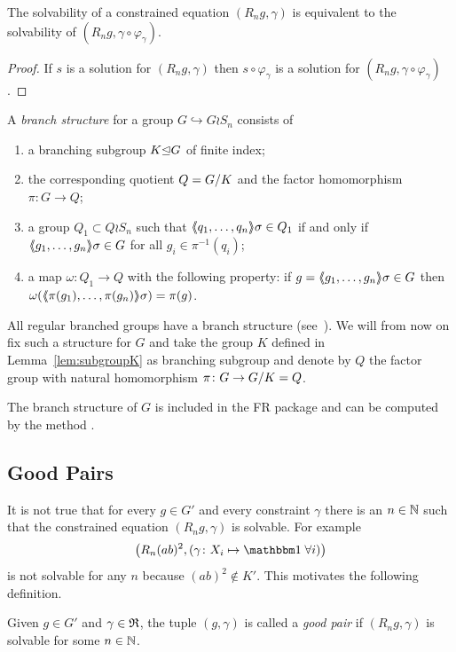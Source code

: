 \documentclass[a4paper,11pt]{amsart}
\begin{document}
\begin{lem} \label{lem:solvabilityWithReducedConstraint}
 The solvability of a constrained equation $(R_n g,\gamma)$ is equivalent to the 
 solvability of $(R_n g,\gamma\circ \varphi_\gamma)$.
\end{lem}
 \begin{proof}
 If $s$ is a solution for $(R_n g,\gamma)$ then $s\circ \varphi_\gamma$ is
 a solution for $(R_n g,\gamma\circ \varphi_\gamma)$. 
\end{proof}


\begin{defi} 
A \emph{branch structure} for a group $G\hookrightarrow G \wr S_n$ consists of  
\begin{enumerate}
 \item a branching subgroup $K{\mathrel\trianglelefteq} G$ of finite index;
 \item the corresponding quotient $Q={G/K}$ and the factor homomorphism $\pi\colon G \to Q$;
 \item a group $Q_1 \subset Q \wr S_n$ such that $\langle\negthickspace\langle q_1,\ldots,q_n\rangle\negthickspace\rangle\sigma\in Q_1$ if
  and only if $\langle\negthickspace\langle g_1,\ldots,g_n\rangle\negthickspace\rangle\sigma \in G$ for all $g_i \in \pi^{-1}(q_i)$;
 \item a map $\omega\colon Q_1 \to Q$ with the following property: if 
      $g=\langle\negthickspace\langle g_1,\ldots,g_n\rangle\negthickspace\rangle\sigma \in G$ then $\omega(\langle\negthickspace\langle\pi(g_1),\ldots,\pi(g_n)\rangle\negthickspace\rangle\sigma) = \pi(g)$.
\end{enumerate}
\end{defi}
All regular branched groups have a branch structure
(see~{\cite[Remark after Definition~5.1]{Bartholdi:RepresentationZetaFunctions}}).
We will from now on fix such a structure for $G$ and take 
the group $K$ defined in Lemma~\ref{lem:subgroupK} as branching subgroup and 
denote by $Q$ the factor group with natural homomorphism $\pi\colon G \to {G/K}=Q$.

\begin{re}
  The branch structure of $G$ is included in the FR package and can be
  computed by the method .
\end{re}

\subsection{Good Pairs}\label{sec:good_pairs}
It is not true that for every $g\in G'$ and every constraint $\gamma$
there is an $n\in\mathbb{N}$ such that the constrained equation
$(R_ng,\gamma)$ is solvable. For example
\[\left(R_n(ab)^2,(\gamma\colon X_i\mapsto\id\;\forall i)\right)\] 
is not solvable for any $n$ because $(ab)^2\notin K'$.  This motivates
the following definition.
\begin{defi}
Given $g\in G'$ and $\gamma\in\mathfrak{R}$, the tuple $(g,\gamma)$ is called a \emph{good pair} if 
$(R_ng,\gamma)$ is solvable for some $n\in\mathbb{N}$.  
\end{defi}
\end{document}
